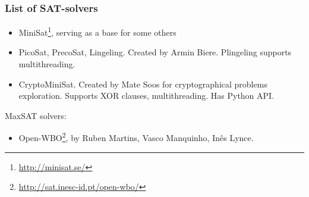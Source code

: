 \subsubsection{List of SAT-solvers}


\begin{itemize}

\item MiniSat\footnote{\url{http://minisat.se/}}, serving as a base for some others

\item PicoSat, PrecoSat, Lingeling. Created by Armin Biere. Plingeling supports multithreading.

\item CryptoMiniSat. Created by Mate Soos for cryptographical problems exploration.
Supports XOR clauses, multithreading.
Has Python API.

\end{itemize}

MaxSAT solvers:

\begin{itemize}

\item Open-WBO\footnote{\url{http://sat.inesc-id.pt/open-wbo/}}, by Ruben Martins, Vasco Manquinho, Inês Lynce.

\end{itemize}

